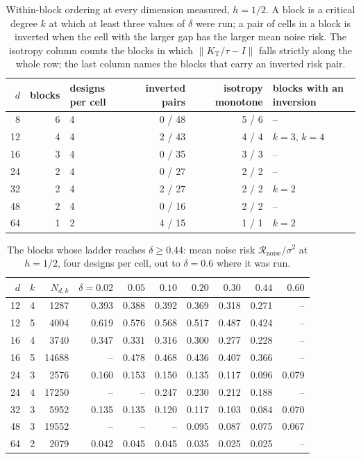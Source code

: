 \documentclass[11pt]{article}
\theoremstyle{definition}
\newcommand{\Kt}{K_{\mathrm{T}}}
\begin{document}
\begin{table}[t]
\centering\small
\caption{Within-block ordering at every dimension measured, $h=1/2$. A block is a critical degree
$k$ at which at least three values of $\delta$ were run; a pair of cells in a block is inverted when
the cell with the larger gap has the larger mean noise risk. The isotropy column counts the blocks in
which $\|\Kt/\tau-I\|$ falls strictly along the whole row; the last column names the blocks that
carry an inverted risk pair.}
\label{tab:gapsum}
\begin{tabular}{rrlrrl}
\toprule
$d$ & blocks & designs per cell & inverted pairs & isotropy monotone & blocks with an inversion\\
\midrule
8 & 6 & 4 & 0 / 48 & 5 / 6 & --\\
12 & 4 & 4 & 2 / 43 & 4 / 4 & $k=3$, $k=4$\\
16 & 3 & 4 & 0 / 35 & 3 / 3 & --\\
24 & 2 & 4 & 0 / 27 & 2 / 2 & --\\
32 & 2 & 4 & 2 / 27 & 2 / 2 & $k=2$\\
48 & 2 & 4 & 0 / 16 & 2 / 2 & --\\
64 & 1 & 2 & 4 / 15 & 1 / 1 & $k=2$\\
\bottomrule
\end{tabular}
\end{table}

\begin{table}[t]
\centering\small
\caption{The blocks whose ladder reaches $\delta\ge0.44$: mean noise risk $\mathcal
R_{\mathrm{noise}}/\sigma^2$ at $h=1/2$, four designs per cell, out to $\delta=0.6$ where it was
run.}
\label{tab:gapdeep}
\begin{tabular}{rrrrrrrrrr}
\toprule
$d$ & $k$ & $N_{d,k}$ & $\delta=0.02$ & $0.05$ & $0.10$ & $0.20$ & $0.30$ & $0.44$ & $0.60$\\
\midrule
12 & 4 & 1287 & 0.393 & 0.388 & 0.392 & 0.369 & 0.318 & 0.271 & --\\
12 & 5 & 4004 & 0.619 & 0.576 & 0.568 & 0.517 & 0.487 & 0.424 & --\\
16 & 4 & 3740 & 0.347 & 0.331 & 0.316 & 0.300 & 0.277 & 0.228 & --\\
16 & 5 & 14688 & -- & 0.478 & 0.468 & 0.436 & 0.407 & 0.366 & --\\
24 & 3 & 2576 & 0.160 & 0.153 & 0.150 & 0.135 & 0.117 & 0.096 & 0.079\\
24 & 4 & 17250 & -- & -- & 0.247 & 0.230 & 0.212 & 0.188 & --\\
32 & 3 & 5952 & 0.135 & 0.135 & 0.120 & 0.117 & 0.103 & 0.084 & 0.070\\
48 & 3 & 19552 & -- & -- & -- & 0.095 & 0.087 & 0.075 & 0.067\\
64 & 2 & 2079 & 0.042 & 0.045 & 0.045 & 0.035 & 0.025 & 0.025 & --\\
\bottomrule
\end{tabular}
\end{table}
\end{document}
